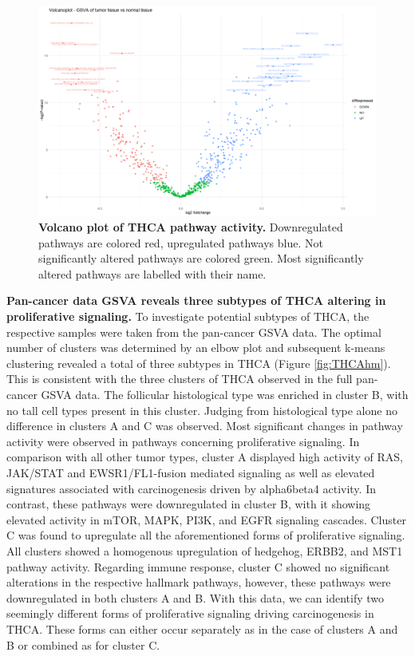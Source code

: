 \documentclass[
  11pt,
  parskip,
  oneside]{scrreprt}
\begin{document}
\begin{figure}

{\centering \includegraphics[width=0.8\linewidth]{figures/Volcanoplot THCA GSVA data} 

}

\caption{\textbf{Volcano plot of THCA pathway activity.} Downregulated pathways are colored red, upregulated pathways blue. Not significantly altered pathways are colored green. Most significantly altered pathways are labelled with their name.}\label{fig:THCAvolcano}
\end{figure}

\textbf{Pan-cancer data GSVA reveals three subtypes of THCA altering in
proliferative signaling.} To investigate potential subtypes of THCA, the
respective samples were taken from the pan-cancer GSVA data. The optimal
number of clusters was determined by an elbow plot and subsequent
k-means clustering revealed a total of three subtypes in THCA (Figure
\ref{fig:THCAhm}). This is consistent with the three clusters of THCA
observed in the full pan-cancer GSVA data. The follicular histological
type was enriched in cluster B, with no tall cell types present in this
cluster. Judging from histological type alone no difference in clusters
A and C was observed. Most significant changes in pathway activity were
observed in pathways concerning proliferative signaling. In comparison
with all other tumor types, cluster A displayed high activity of RAS,
JAK/STAT and EWSR1/FL1-fusion mediated signaling as well as elevated
signatures associated with carcinogenesis driven by alpha6beta4
activity. In contrast, these pathways were downregulated in cluster B,
with it showing elevated activity in mTOR, MAPK, PI3K, and EGFR
signaling cascades. Cluster C was found to upregulate all the
aforementioned forms of proliferative signaling. All clusters showed a
homogenous upregulation of hedgehog, ERBB2, and MST1 pathway activity.
Regarding immune response, cluster C showed no significant alterations
in the respective hallmark pathways, however, these pathways were
downregulated in both clusters A and B. With this data, we can identify
two seemingly different forms of proliferative signaling driving
carcinogenesis in THCA. These forms can either occur separately as in
the case of clusters A and B or combined as for cluster C.
\end{document}
